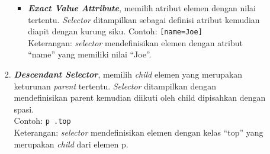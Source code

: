 \documentclass[a4paper,twoside]{article}
\begin{document}
\begin{enumerate}
\begin{enumerate}
\begin{enumerate}
\begin{itemize}
			\item \textit{\textbf{Exact Value Attribute}}, memilih atribut elemen dengan nilai tertentu. \textit{Selector} ditampilkan sebagai definisi atribut kemudian diapit dengan kurung siku.
			Contoh: \texttt{[name=Joe]}\\
			Keterangan: \textit{selector} mendefinisikan elemen dengan atribut ``name'' yang memiliki nilai ``Joe''. 
		\end{itemize}
		
	\item \textit{\textbf{Descendant Selector}}, memilih \textit{child} elemen yang merupakan keturunan \textit{parent} tertentu. \textit{Selector} ditampilkan dengan mendefinisikan parent kemudian diikuti oleh child dipisahkan dengan spasi.\\
			Contoh: \texttt{p .top}\\
			Keterangan: \textit{selector} mendefinisikan elemen dengan kelas ``top'' yang merupakan \textit{child} dari elemen p. 
\end{enumerate}		

\end{enumerate}



\end{enumerate}
\end{document}
